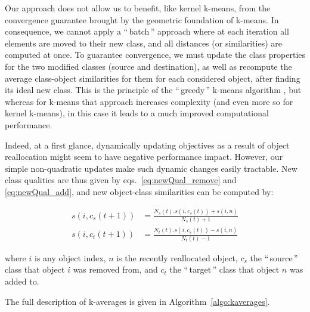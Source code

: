 \documentclass[natbib,smallextended]{svjour3}
\newcommand{\gl}[1]{``\,#1\,''} %
\begin{document}
Our approach does not allow us to benefit, like kernel k-means, from the convergence guarantee brought by the geometric foundation of k-means. In consequence, we cannot apply a \gl{batch} approach where at each iteration all elements are moved to their new class, and all distances (or similarities) are computed at once. To guarantee convergence, we must update the class properties for the two modified classes (source and destination), as well as recompute the average class-object similarities for them for each considered object, after finding its ideal new class. This is the principle of the \gl{greedy} k-means algorithm \citep[Chapter10.8]{Duda01}, but whereas for k-means that approach increases complexity (and even more so for kernel k-means), in this case it leads to a much improved computational performance.

Indeed, at a first glance, dynamically updating objectives as a result of object reallocation might seem to have negative performance impact. However, our simple non-quadratic updates make such dynamic changes easily tractable. New class qualities are thus given by eqs.~\ref{eq:newQual_remove} and \ref{eq:newQual_add}, and new object-class similarities can be computed by:


\begin{equation}
	\begin{aligned}
    s(i, c_s(t+1)) &= \frac{N_s(t).s(i, c_s(t)) + s(i,n)}{N_s(t)+1} \\
    s(i, c_t(t+1)) &= \frac{N_t(t).s(i, c_s(t)) - s(i,n)}{N_t(t)-1}
   	\end{aligned}
  \label{eq:newSimilNewC}
\end{equation}

\noindent where $i$ is any object index, $n$ is the recently reallocated object, $c_s$ the \gl{source} class that object $i$ was removed from, and $c_t$ the \gl{target} class that object $n$ was added to.

The full description of k-averages is given in Algorithm~\ref{algo:kaverages}.
\end{document}
